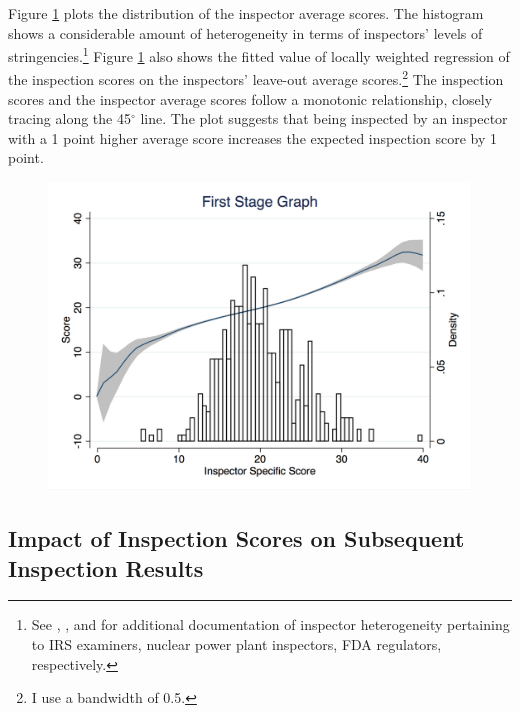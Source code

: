 \documentclass[10pt]{article} %
\begin{document}
Figure \ref{first_stage_fig} plots the distribution of the inspector average scores. The histogram shows a considerable amount of heterogeneity in terms of inspectors' levels of stringencies.\footnote{See \cite{Feinstein_89}, \cite{Feinstein_91}, and \cite{Macher_11} for additional documentation of inspector heterogeneity pertaining to IRS examiners, nuclear power plant inspectors, FDA regulators, respectively.} Figure \ref{first_stage_fig} also shows the fitted value of locally weighted regression of the inspection scores on the inspectors' leave-out average scores.\footnote{I use a bandwidth of 0.5.} The inspection scores and the inspector average scores follow a monotonic relationship, closely tracing along the 45$^\circ$ line. The plot suggests that being inspected by an inspector with a 1 point higher average score increases the expected inspection score by 1 point.
\begin{figure}[htbp]
\centering
\includegraphics[scale = 0.35]{Figures/first_stage_score.png}
\caption{}
\label{first_stage_fig}
\end{figure}

\subsection{Impact of Inspection Scores on Subsequent Inspection Results}
\end{document}
